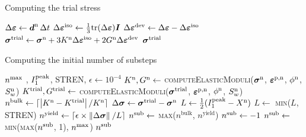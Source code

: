 \begin{breakablealgorithm}
  \caption{Computing the trial stress}
  \begin{algorithmic}[1]
      \State $\Delta\boldsymbol{\varepsilon} \leftarrow \boldsymbol{d}^{\text{n}}\,\Delta t$
      \State $\Delta\boldsymbol{\varepsilon}^{\text{iso}} \leftarrow \tfrac{1}{3} \text{tr}(\Delta\boldsymbol{\varepsilon}) \boldsymbol{I}$
      \State $\Delta\boldsymbol{\varepsilon}^{\text{dev}} \leftarrow \Delta\boldsymbol{\varepsilon} - \Delta\boldsymbol{\varepsilon}^{\text{iso}}$
      \State $\boldsymbol{\sigma}^{\text{trial}} \leftarrow \boldsymbol{\sigma}^{\text{n}} + 3 K^{\text{n}} \Delta\boldsymbol{\varepsilon}^{\text{iso}} 
               + 2 G^{\text{n}} \Delta\boldsymbol{\varepsilon}^{\text{dev}}$ 
      \State \Return $\boldsymbol{\sigma}^{\text{trial}}$
    \EndProcedure
  \end{algorithmic}
\end{breakablealgorithm}

\begin{breakablealgorithm}
  \caption{Computing the initial number of substeps}
  \begin{algorithmic}[1]
    \Require $n^{\text{max}}$ , $I_1^{\text{peak}}$, STREN, $\epsilon \leftarrow 10^{-4}$
      \State $K^{\text{n}}, G^{\text{n}} \leftarrow$ \textsc{computeElasticModuli}($\boldsymbol{\sigma}^{\text{n}}$, $\boldsymbol{\varepsilon}^{\text{p},\text{n}}$, $\phi^{\text{n}}$, $S_w^{\text{n}}$)
      \State $K^{\text{trial}}, G^{\text{trial}} \leftarrow$ \textsc{computeElasticModuli}($\boldsymbol{\sigma}^{\text{trial}}$, $\boldsymbol{\varepsilon}^{\text{p},\text{n}}$, $\phi^{\text{n}}$, $S_w^{\text{n}}$)
      \State $n^\text{bulk} \leftarrow \lceil\left|K^{\text{n}} - K^{\text{trial}}\right|/K^{\text{n}}\rceil$  
      \State $\Delta\boldsymbol{\sigma} \leftarrow \boldsymbol{\sigma}^{\text{trial}} - \boldsymbol{\sigma}^{\text{n}}$
      \State $L \leftarrow \tfrac{1}{2}(I_1^{\text{peak}} - X^{\text{n}})$
        \State $L \leftarrow $ \textsc{min}($L$, STREN)
      \EndIf
      \State $n^{\text{yield}} \leftarrow \lceil\epsilon \times \left\lVert\Delta\boldsymbol{\sigma}\right\rVert_{}/L\rceil$
      \State $n^{\text{sub}} \leftarrow$ \textsc{max}($n^\text{bulk}$, $n^\text{yield}$)
        \State $n^{\text{sub}} \leftarrow -1$
      \Else
        \State $n^{\text{sub}} \leftarrow$  \textsc{min}(\textsc{max}($n^{\text{sub}}$, 1), $n^{\text{max}}$)
      \EndIf
      \State \Return $n^{\text{sub}}$
    \EndProcedure
  \end{algorithmic}
\end{breakablealgorithm}

